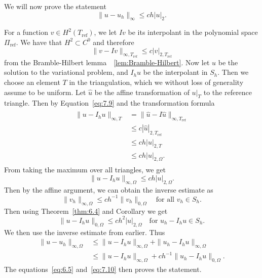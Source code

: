 We will now prove the statement
\begin{equation}
    \|u-u_h\|_{\infty}\leq ch|u|_2.
\end{equation}
\begin{bev}
    For a function $v\in H^2(T_{\text{ref}})$, we let $Iv$ be its interpolant in the polynomial space $\Pi_{\text{ref}}$.
    We have that $H^2\subset C^0$ and therefore 
    \begin{equation}
        \|v-Iv\|_{\infty,T_\text{ref}} \leq c|v|_{2,T_\text{ref}}
        \label{eq:7.9}
    \end{equation}
    from the Bramble-Hilbert lemma~~\ref{lem:Bramble-Hilbert}.
    Now let $u$ be the solution to the variational problem, and $I_h u$ be the interpolant in $S_h$.
    Then we choose an element $T$ in the triangulation, which we without loss of generality assume to be uniform. 
    Let $\hat{u}$ be the affine transformation of $u|_T$ to the reference triangle.
    Then by Equation~\ref{eq:7.9} and the transformation formula %
    \begin{align}
        \begin{split}
            \|u-I_h u\|_{\infty,T} &= \|\hat{u} - I\hat{u}\|_{\infty,T_{\text{ref}}} \\
            &\leq c|\hat{u}|_{2,T_{\text{ref}}} \\
            &\leq ch|u|_{2,T} \\
            &\leq ch|u|_{2,\Omega}.
        \end{split}
        \label{eq:7.10}
    \end{align}
    From taking the maximum over all triangles, we get
    \begin{equation}
        \|u - I_h u \|_{\infty,\Omega} \leq ch|u|_{2,\Omega}.
    \end{equation}
    Then by the affine argument, we can obtain the inverse estimate as
    \begin{equation}
        \|v_h\|_{\infty,\Omega} \leq ch^{-1} \|v_h\|_{0,\Omega} \quad \text{for all } v_h\in S_h.
    \end{equation}
    Then using Theorem~\ref{thm:6.4} and Corollary %
    we get
    \begin{equation}
        \|u-I_h u\|_{0,\Omega} \leq ch^2|u|_{2,\Omega}\quad \text{for } u_h-I_h u\in S_h.
    \end{equation}
    We then use the inverse estimate from earlier. Thus 
    \begin{align}
        \|u-u_h\|_{\infty,\Omega} &\leq \|u-I_h u\|_{\infty,\Omega} + \|u_h-I_h u\|_{\infty,\Omega} \\
        &\leq \|u-I_h u\|_{\infty,\Omega} + ch^{-1} \|u_h-I_h u\|_{0,\Omega}.
    \end{align}
    The equations~\ref{eq:6.5} and~\ref{eq:7.10} then proves the statement.
\end{bev}